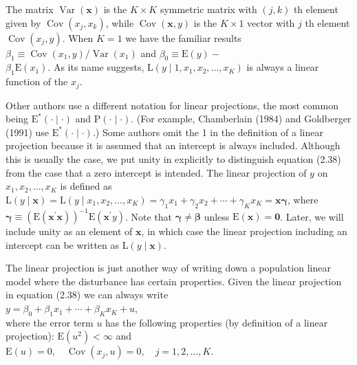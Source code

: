 \documentclass[10pt]{article}
\begin{document}
The matrix $\operatorname{Var}(\mathbf{x})$ is the $K \times K$ symmetric matrix with $(j, k)$ th element given by $\operatorname{Cov}\left(x_{j}, x_{k}\right)$, while $\operatorname{Cov}(\mathbf{x}, y)$ is the $K \times 1$ vector with $j$ th element $\operatorname{Cov}\left(x_{j}, y\right)$. When $K=1$ we have the familiar results $\beta_{1} \equiv \operatorname{Cov}\left(x_{1}, y\right) / \operatorname{Var}\left(x_{1}\right)$ and $\beta_{0} \equiv \mathrm{E}(y)-$\\
$\beta_{1} \mathrm{E}\left(x_{1}\right)$. As its name suggests, $\mathrm{L}\left(y \mid 1, x_{1}, x_{2}, \ldots, x_{K}\right)$ is always a linear function of the $x_{j}$.

Other authors use a different notation for linear projections, the most common being $\mathrm{E}^{*}(\cdot \mid \cdot)$ and $\mathrm{P}(\cdot \mid \cdot)$. (For example, Chamberlain (1984) and Goldberger (1991) use $\mathrm{E}^{*}(\cdot \mid \cdot)$.) Some authors omit the 1 in the definition of a linear projection because it is assumed that an intercept is always included. Although this is usually the case, we put unity in explicitly to distinguish equation (2.38) from the case that a zero intercept is intended. The linear projection of $y$ on $x_{1}, x_{2}, \ldots, x_{K}$ is defined as\\
$\mathrm{L}(y \mid \mathbf{x})=\mathrm{L}\left(y \mid x_{1}, x_{2}, \ldots, x_{K}\right)=\gamma_{1} x_{1}+\gamma_{2} x_{2}+\cdots+\gamma_{K} x_{K}=\mathbf{x} \boldsymbol{\gamma}$, where $\boldsymbol{\gamma} \equiv\left(\mathrm{E}\left(\mathbf{x}^{\prime} \mathbf{x}\right)\right)^{-1} \mathrm{E}\left(\mathbf{x}^{\prime} y\right)$. Note that $\boldsymbol{\gamma} \neq \boldsymbol{\beta}$ unless $\mathrm{E}(\mathbf{x})=\mathbf{0}$. Later, we will include unity as an element of $\mathbf{x}$, in which case the linear projection including an intercept can be written as $\mathrm{L}(y \mid \mathbf{x})$.

The linear projection is just another way of writing down a population linear model where the disturbance has certain properties. Given the linear projection in equation (2.38) we can always write\\
$y=\beta_{0}+\beta_{1} x_{1}+\cdots+\beta_{K} x_{K}+u$,\\
where the error term $u$ has the following properties (by definition of a linear projection): $\mathrm{E}\left(u^{2}\right)<\infty$ and\\
$\mathrm{E}(u)=0, \quad \operatorname{Cov}\left(x_{j}, u\right)=0, \quad j=1,2, \ldots, K$.
\end{document}
